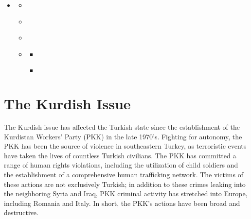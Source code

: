 \documentclass[letterpaper,10pt,english]{sphinxmanual}
\begin{document}
\begin{sphinxShadowBox}
\begin{itemize}
\item {} 
\sphinxAtStartPar
{}\label{\detokenize{introduction:id2}}{\hyperref[\detokenize{introduction:introduction}]{}}
\begin{itemize}
\item {} 
\sphinxAtStartPar
{}\label{\detokenize{introduction:id3}}{\hyperref[\detokenize{introduction:the-kurdish-issue}]{}}

\item {} 
\sphinxAtStartPar
{}\label{\detokenize{introduction:id4}}{\hyperref[\detokenize{introduction:the-turkish-issue}]{}}

\item {} 
\sphinxAtStartPar
{}\label{\detokenize{introduction:id5}}{\hyperref[\detokenize{introduction:intent-of-research}]{}}

\item {} 
\sphinxAtStartPar
{}\label{\detokenize{introduction:id6}}{\hyperref[\detokenize{introduction:the-data}]{}}
\begin{itemize}
\item {} 
\sphinxAtStartPar
{}\label{\detokenize{introduction:id7}}{\hyperref[\detokenize{introduction:scope}]{}}

\item {} 
\sphinxAtStartPar
{}\label{\detokenize{introduction:id8}}{\hyperref[\detokenize{introduction:coding-procedure}]{}}

\end{itemize}

\end{itemize}

\end{itemize}
\end{sphinxShadowBox}


\section{The Kurdish Issue}
\label{\detokenize{introduction:the-kurdish-issue}}
\sphinxAtStartPar
The Kurdish issue has affected the Turkish state since the establishment of the Kurdistan Workers’ Party (PKK) in the late 1970’s. Fighting for autonomy, the PKK has been the source of violence in southeastern Turkey, as terroristic events have taken the lives of countless Turkish civilians. The PKK has committed a range of human rights violations, including the utilization of child soldiers and the establishment of a comprehensive human trafficking network. The victims of these actions are not exclusively Turkish; in addition to these crimes leaking into the neighboring Syria and Iraq, PKK criminal activity has stretched into Europe, including Romania and Italy. In short, the PKK’s actions have been broad and destructive.
\end{document}

